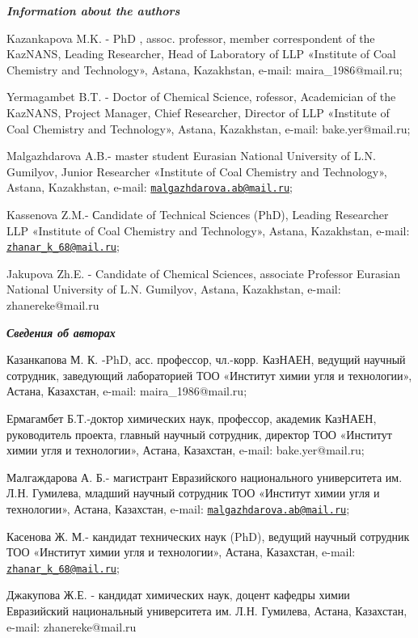 \emph{{\bfseries Information about the authors}}

Kazankapova M.K. - PhD , assoc. professor, member correspondent of the
KazNANS, Leading Researcher, Head of Laboratory of LLP «Institute of
Coal Chemistry and Technology», Astana, Kazakhstan, e-mail:
maira\_1986@mail.ru;

Yermagambet B.T. - Doctor of Chemical Science, rofessor, Academician of
the KazNANS, Project Manager, Chief Researcher, Director of LLP
«Institute of Coal Chemistry and Technology», Astana, Kazakhstan,
e-mail: bake.yer@mail.ru;

Malgazhdarova A.B.- master student Eurasian National University of L.N.
Gumilyov, Junior Researcher «Institute of Coal Chemistry and
Technology», Astana, Kazakhstan, e-mail:
\href{mailto:malgazhdarova.ab@mail.ru}{\nolinkurl{malgazhdarova.ab@mail.ru}};

Kassenova Z.M.- Сandidate of Technical Sciences (PhD), Leading
Researcher LLP «Institute of Coal Chemistry and Technology», Astana,
Kazakhstan, e-mail:
\href{mailto:zhanar_k_68@mail.ru}{\nolinkurl{zhanar\_k\_68@mail.ru}};

Jakupova Zh.E. - Candidate of Chemical Sciences, associate Professor
Eurasian National University of L.N. Gumilyov, Astana, Kazakhstan,
e-mail: zhanereke@mail.ru

\emph{{\bfseries Сведения об авторах}}

Казанкапова М. К. -PhD, асс. профессор, чл.-корр. КазНАЕН, ведущий
научный сотрудник, заведующий лабораторией ТОО «Институт химии угля и
технологии», Астана, Казахстан, e-mail: maira\_1986@mail.ru;

Ермагамбет Б.Т.-доктор химических наук, профессор, академик КазНАЕН,
руководитель проекта, главный научный сотрудник, директор ТОО «Институт
химии угля и технологии», Астана, Казахстан, e-mail: bake.yer@mail.ru;

Малгаждарова А. Б.- магистрант Евразийского национального университета
им. Л.Н. Гумилева, младший научный сотрудник ТОО «Институт химии угля и
технологии», Астана, Казахстан, e-mail:
\href{mailto:malgazhdarova.ab@mail.ru}{\nolinkurl{malgazhdarova.ab@mail.ru}};

Касенова Ж. М.- кандидат технических наук (PhD), ведущий научный
сотрудник ТОО «Институт химии угля и технологии», Астана, Казахстан,
e-mail:
\href{mailto:zhanar_k_68@mail.ru}{\nolinkurl{zhanar\_k\_68@mail.ru}};

Джакупова Ж.Е. - кандидат химических наук, доцент кафедры химии
Евразийский национальный университета им. Л.Н. Гумилева, Астана,
Казахстан, e-mail: zhanereke@mail.ru
